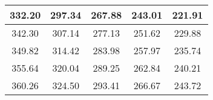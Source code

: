 \begin{large}\begin{tabular}{|c|c|c|c|c|}
\hline
332.20&297.34&267.88&243.01&221.91\\\hline
342.30&307.14&277.13&251.62&229.88\\\hline
349.82&314.42&283.98&257.97&235.74\\\hline
355.64&320.04&289.25&262.84&240.21\\\hline
360.26&324.50&293.41&266.67&243.72\\\hline
\end{tabular}
\end{large}